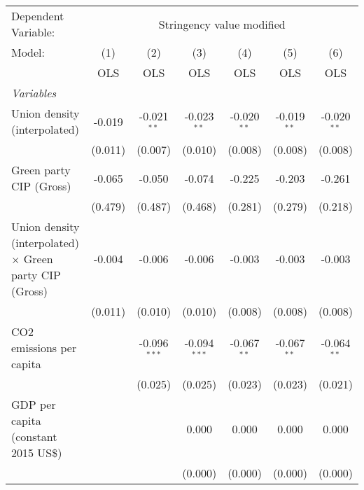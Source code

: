 
\begingroup
\centering
\begin{tabular}{lcccccc}
   \toprule
   Dependent Variable: & \multicolumn{6}{c}{Stringency value modified}\\
   Model:                                                         & (1)     & (2)            & (3)            & (4)           & (5)           & (6)\\  
                                                                  &  OLS    & OLS            & OLS            & OLS           & OLS           & OLS\\  
   \midrule
   \emph{Variables}\\
   Union density (interpolated)                                   & -0.019  & -0.021$^{**}$  & -0.023$^{**}$  & -0.020$^{**}$ & -0.019$^{**}$ & -0.020$^{**}$\\   
                                                                  & (0.011) & (0.007)        & (0.010)        & (0.008)       & (0.008)       & (0.008)\\   
   Green party CIP (Gross)                                        & -0.065  & -0.050         & -0.074         & -0.225        & -0.203        & -0.261\\   
                                                                  & (0.479) & (0.487)        & (0.468)        & (0.281)       & (0.279)       & (0.218)\\   
   Union density (interpolated) $\times$ Green party CIP (Gross)  & -0.004  & -0.006         & -0.006         & -0.003        & -0.003        & -0.003\\   
                                                                  & (0.011) & (0.010)        & (0.010)        & (0.008)       & (0.008)       & (0.008)\\   
   CO2 emissions per capita                                       &         & -0.096$^{***}$ & -0.094$^{***}$ & -0.067$^{**}$ & -0.067$^{**}$ & -0.064$^{**}$\\   
                                                                  &         & (0.025)        & (0.025)        & (0.023)       & (0.023)       & (0.021)\\   
   GDP per capita (constant 2015 US\$)                            &         &                & 0.000          & 0.000         & 0.000         & 0.000\\   
                                                                  &         &                & (0.000)        & (0.000)       & (0.000)       & (0.000)\\   

\end{tabular}
